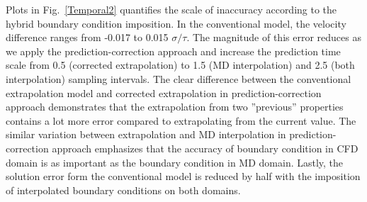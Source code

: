 \documentclass[preprint,12pt]{elsarticle}
\begin{document}
Plots in Fig.~\ref{Temporal2} quantifies the scale of inaccuracy according to the hybrid boundary condition imposition. In the conventional model, the velocity difference ranges from -0.017 to 0.015 $\sigma/\tau$. The magnitude of this error reduces as we apply the prediction-correction approach and increase the prediction time scale from 0.5 (corrected extrapolation) to 1.5 (MD interpolation) and 2.5 (both interpolation) sampling intervals. The clear difference between the conventional extrapolation model and corrected extrapolation in prediction-correction approach demonstrates that the extrapolation from two ''previous'' properties contains a lot more error compared to extrapolating from the current value. The similar variation between extrapolation and MD interpolation in prediction-correction approach emphasizes that the accuracy of boundary condition in CFD domain is as important as the boundary condition in MD domain. Lastly, the solution error form the conventional model is reduced by half with the imposition of interpolated boundary conditions on both domains.
\end{document}
